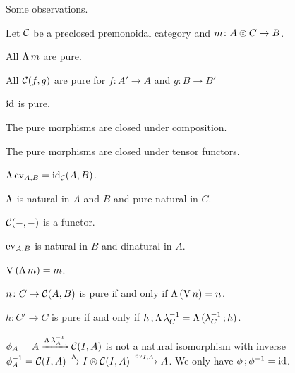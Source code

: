 \documentclass[runningheads,envcountsame]{llncs}
\begin{document}
Some observations.
\begin{lemma}
    Let $\mathcal{C}$ be a preclosed premonoidal category and $m\colon \tensor{A}{C} \to B$.
    \begin{lemmalist}
    \item \label{lem:curry-pure} All $\curry\,m$ are pure.
    \item \label{lem:hom-functor-pure} All $\mathcal{C}(f, g)$ are pure for $f\colon A' \to A$ and $g\colon B \to B'$
    \item \label{lem:id-pure} $\id$ is pure.
    \item \label{lem:pure-composition-pure} The pure morphisms are closed under composition.
    \item \label{lem:pure-tensor-pure} The pure morphisms are closed under tensor functors.
    \item \label{lem:curry-eval} $\curry\,\eval_{A, B} = \id_\C(A, B)$.
    \item \label{lem:curry-natural} $\curry$ is natural in $A$ and $B$ and pure-natural in $C$.
    \item \label{lem:hom-functor} $\mathcal{C}(-, -)$ is a functor.
    \item \label{lem:eval-natural} $\eval_{A, B}$ is natural in $B$ and dinatural in $A$.
    \item \label{lem:curry-uncurry} $\uncurry\,(\curry\,m) = m$.
    \item \label{lem:pure-uncurry-curry} $n\colon C \to \mathcal{C}(A, B)$ is pure if and only if $\curry\,(\uncurry\,n) = n$.
    \item \label{lem:pure-via-unit-hom} $h\colon C' \to C$ is pure if and only if $\comp{h}{\curry\,\unitl_C^{-1}} = \curry\,(\comp{\unitl_C^{-1}}{h})$.
    \item $\phi_A = A \xrightarrow{\curry\,\unitl_A^{-1}} \C(I, A)$ is not a natural isomorphism with inverse $\phi_A^{-1} = \C(I, A) \xrightarrow{\unitl} \tensor{I}{\C(I, A)} \xrightarrow{\eval_{I, A}} A$. We only have $\comp{\phi}{\phi^{-1}} = \id$.
    \end{lemmalist}    
\end{lemma}
\end{document}
